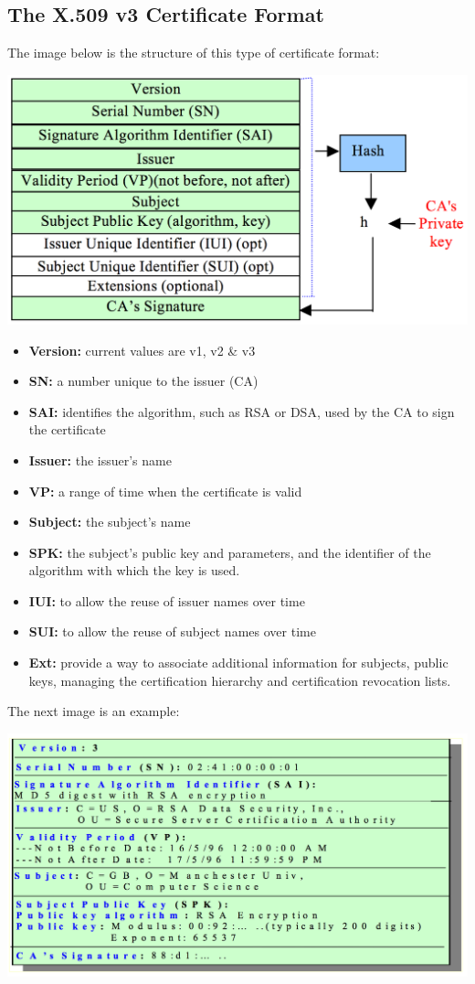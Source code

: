 \documentclass{article}
\begin{document}
\subsection{The X.509 v3 Certificate Format}
The image below is the structure of this type of certificate format:
\begin{center}
  \includegraphics[scale=0.4]{x509.png}
\end{center}
\begin{itemize}
  \item \textbf{Version:} current values are v1, v2 \& v3
  \item \textbf{SN:} a number unique to the issuer (CA)
  \item \textbf{SAI:} identifies the algorithm, such as RSA or DSA, used by the CA to sign the certificate
  \item \textbf{Issuer:} the issuer's name
  \item \textbf{VP:} a range of time when the certificate is valid
  \item \textbf{Subject:} the subject's name
  \item \textbf{SPK:} the subject's public key and parameters, and the identifier of the algorithm with which the key is used.
  \item \textbf{IUI:} to allow the reuse of issuer names over time
  \item \textbf{SUI:} to allow the reuse of subject names over time
  \item \textbf{Ext:} provide a way to associate additional information for subjects, public keys, managing the certification hierarchy and certification revocation lists.
\end{itemize}
The next image is an example:
\begin{center}
  \includegraphics[scale=0.5]{x509-example.png}
\end{center}
\end{document}
